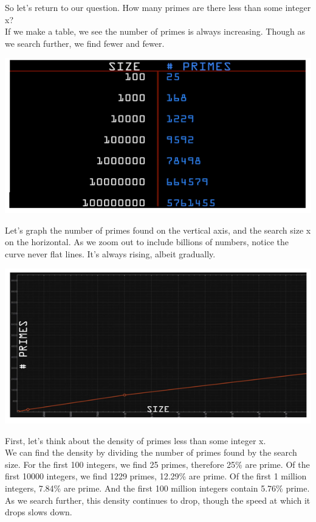 \documentclass{report}
\begin{document}
So let's return to our question. How many primes are there less than some integer x?\\
If we make a table, we see the number of primes is always increasing. Though as we search further, we find fewer and fewer.
\begin{center}
	\includegraphics[scale=1]{57.png}
\end{center}
 Let's graph the number of primes found on the vertical axis, and the search size x on the horizontal. As we zoom out to include billions of numbers, notice the curve never flat lines. It's always rising, albeit gradually.
\begin{center}
	\includegraphics[scale=1]{58.png}
\end{center}
First, let's think about the density of primes less than some integer x.\\
We can find the density by dividing the number of primes found by the search size. For the first 100 integers, we find 25 primes, therefore 25\% are prime. Of the first 10000 integers, we find 1229 primes, 12.29\% are prime. Of the first 1 million integers, 7.84\% are prime. And the first 100 million integers contain 5.76\% prime. As we search further, this density continues to drop, though the speed at which it drops slows down.\\
\end{document}
